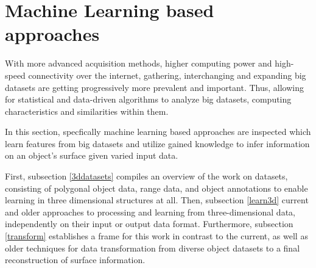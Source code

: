\section{Machine Learning based approaches}
\label{ml_approaches}
With more advanced acquisition methods, higher computing power 
and high-speed connectivity over the internet, gathering, interchanging
 and expanding big datasets are getting progressively more prevalent
  and important. 
  Thus, allowing for statistical and data-driven algorithms to 
  analyze big datasets, computing characteristics and similarities
   within them. 
   
  In this section, specfically machine learning based approaches are inspected which learn features from big
  datasets and utilize gained knowledge to infer information on an object's surface given varied input data.

  First, subsection \ref{3ddatasets} compiles an overview of the work on datasets, consisting of polygonal object data, range data, and object annotations
  to enable learning in three dimensional structures at all.
  Then, subsection \ref{learn3d}  current and older approaches to processing 
  and learning from three-dimensional data, independently on their input or output data
  format. 
  Furthermore, subsection \ref{transform} establishes a frame for this work in 
  contrast to the current, as well as older techniques for data 
  transformation from diverse object datasets to a final reconstruction
  of surface information.

